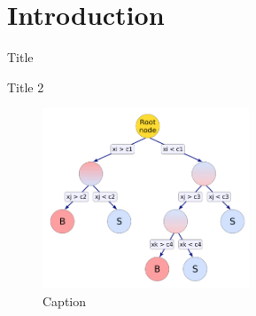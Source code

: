 \section{Introduction}
\begin{frame}{Title}

\end{frame}


\begin{frame}{Title 2}
    \begin{figure}\vspace{-0.3cm}
            \includegraphics[width=0.55\textwidth]{figures/bdt_example_from_TMVA_handbook.png}
            \caption{Caption}
        \end{figure}
\end{frame}